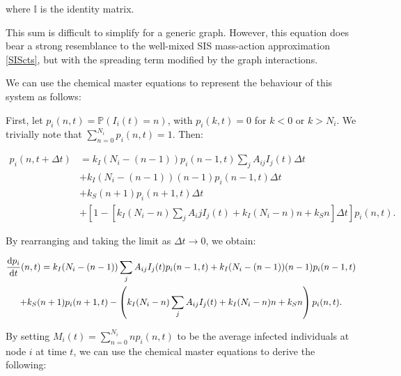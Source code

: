 \documentclass[12pt,a4paper,openany,twoside]{book}
\renewcommand{\d}{{\mathrm d}}
\newcommand{\fd}[2]{\mathchoice{\frac{\d #1}{\d #2}}{\d #1/\d #2}{\d #1/\d #2}{\d #1/\d #2}}
\begin{document}
where $\mathbb{I}$ is the identity matrix.

This sum is difficult to simplify for a generic graph. However, this equation does bear a strong resemblance to the well-mixed SIS mass-action approximation \ref{SIScts}, but with the spreading term modified by the graph interactions.

We can use the chemical master equations to represent the behaviour of this system as follows:

First, let $p_i(n, t) = \mathbb{P}(I_i(t) = n)$, with $p_i(k, t) = 0$ for $k < 0$ or $k > N_i$. We trivially note that $\sum_{n=0}^{N_i} p_i(n, t) = 1$. Then:

\begin{equation}
\begin{split}
	p_i(n, t + \Delta t) &= k_I (N_i - (n-1)) p_i(n-1, t) \sum_j A_{ij} I_j(t) \Delta t \\
	&+ k_I (N_i - (n-1)) (n-1) p_i(n-1, t) \Delta t \\
	&+ k_S (n+1) p_i(n+1, t) \Delta t \\
	&+ \left[ 1 - \left[ k_I (N_i - n) \sum_j A_ij I_j(t) + k_I (N_i - n) n + k_S n \right] \Delta t \right] p_i(n, t).
\end{split}
\end{equation}

By rearranging and taking the limit as $\Delta t \rightarrow 0$, we obtain:

\begin{multline}
	\fd {p_i} {t} (n, t) = k_I (N_i - (n-1)) \sum_j A_{ij} I_j(t) p_i(n-1, t) + k_I(N_i - (n-1))(n-1) p_i(n-1, t)\\
	+ k_S (n+1) p_i(n+1, t) - \left(k_I (N_i - n) \sum_j A_{ij} I_j(t) + k_I (N_i - n) n+ k_S n \right) p_i(n, t).
\end{multline}

By setting $M_i(t) = \sum_{n=0}^{N_i} n p_i (n, t)$ to be the average infected individuals at node $i$ at time $t$, we can use the chemical master equations to derive the following:
\end{document}
